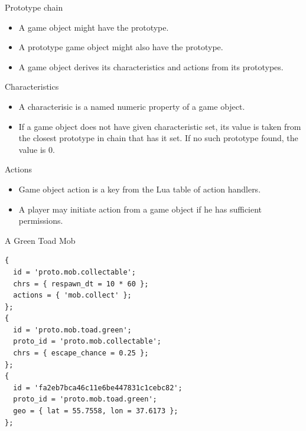 \documentclass[aspectratio=169,handout,bigger]{beamer}
\begin{document}

\begin{frame}{Prototype chain}
  \begin{itemize}
    \item A game object might have the prototype.
    \item A prototype game object might also have the prototype.
    \item A game object derives its characteristics and actions
          from its prototypes.
  \end{itemize}
\end{frame}


\begin{frame}{Characteristics}
  \begin{itemize}
    \item A characterisic is a named numeric property of a game object.
    \item If a game object does not have given characteristic set,
          its value is taken from the closest prototype in chain
          that has it set. If no such prototype found, the value is 0.
  \end{itemize}
\end{frame}


\begin{frame}{Actions}
  \begin{itemize}
    \item Game object action is a key from the Lua table of action handlers.
    \item A player may initiate action from a game object
          if he has sufficient permissions.
  \end{itemize}
\end{frame}


\begin{frame}[fragile]{A Green Toad Mob}
\begin{verbatim}
{
  id = 'proto.mob.collectable';
  chrs = { respawn_dt = 10 * 60 };
  actions = { 'mob.collect' };
};
{
  id = 'proto.mob.toad.green';
  proto_id = 'proto.mob.collectable';
  chrs = { escape_chance = 0.25 };
};
{
  id = 'fa2eb7bca46c11e6be447831c1cebc82';
  proto_id = 'proto.mob.toad.green';
  geo = { lat = 55.7558, lon = 37.6173 };
};
\end{verbatim}
\end{frame}
\end{document}
